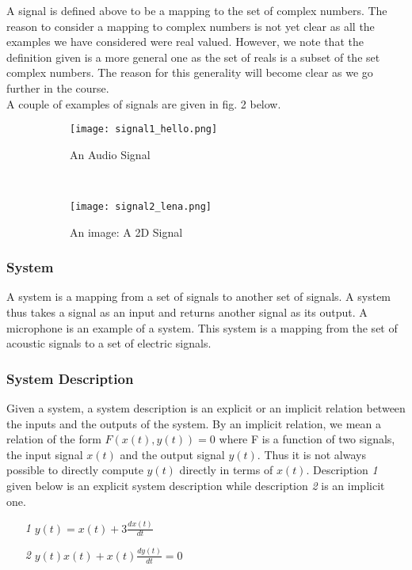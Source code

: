 A signal is defined above to be a mapping to the set of complex numbers. The reason to consider a mapping to complex numbers is not yet clear as all the examples we have considered were real valued. However, we note that the definition given is a more general one as the set of reals is a subset of the set complex numbers. The reason for this generality will become clear as we go further in the course.\\

A couple of examples of signals are given in fig. 2 below.


\begin{figure}[H]
        \centering
        \begin{subfigure}[b]{\textwidth}
                \texttt{[image: signal1\_hello.png]}
                \caption{An Audio Signal}
        \end{subfigure}
        \quad
        ~ %
        \centering
        \begin{subfigure}[b]{0.5\textwidth}
                \texttt{[image: signal2\_lena.png]}
                \caption{An image: A 2D Signal}
        \end{subfigure}
        \caption{}
\end{figure}

\subsubsection{System}
A system is a mapping from a set of signals to another set of signals. A system thus takes a signal as an input and returns another signal as its output. A microphone is an example of a system. This system is a mapping from the set of acoustic signals to a set of electric signals.

\subsubsection{System Description}
Given a system, a system description is an explicit or an implicit relation between the inputs and the outputs of the system. By an implicit relation, we mean a relation of the form $F(x(t), y(t)) = 0$ where F is a function of two signals, the input signal $x(t)$ and the output signal $y(t)$. Thus it is not always possible to directly compute $y(t)$ directly in terms of $x(t)$. Description \textit{1} given below is an explicit system description while description \textit{2} is an implicit one.
\begin{enumerate}
\item[\textit{1}] $y(t) = x(t) + 3\frac{dx(t)}{dt}$
\item[\textit{2}] $y(t)x(t) + x(t)\frac{dy(t)}{dt} = 0$
\end{enumerate}

